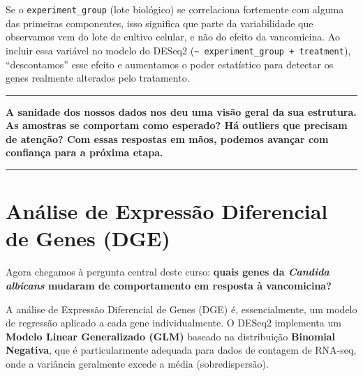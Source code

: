 \documentclass[
  letterpaper,
  DIV=11,
  numbers=noendperiod]{scrreprt}
\begin{document}
\begin{tcolorbox}[enhanced jigsaw, arc=.35mm, colframe=quarto-callout-important-color-frame, breakable, bottomrule=.15mm, colback=white, left=2mm, titlerule=0mm, opacityback=0, title=\textcolor{quarto-callout-important-color}{\faExclamation}\hspace{0.5em}{Por que incluir covariáveis?}, leftrule=.75mm, colbacktitle=quarto-callout-important-color!10!white, bottomtitle=1mm, toprule=.15mm, toptitle=1mm, rightrule=.15mm, opacitybacktitle=0.6, coltitle=black]

Se o \texttt{experiment\_group} (lote biológico) se correlaciona
fortemente com alguma das primeiras componentes, isso significa que
parte da variabilidade que observamos vem do lote de cultivo celular, e
não do efeito da vancomicina. Ao incluir essa variável no modelo do
DESeq2 (\texttt{\textasciitilde{}\ experiment\_group\ +\ treatment}),
``descontamos'' esse efeito e aumentamos o poder estatístico para
detectar os genes realmente alterados pelo tratamento.

\end{tcolorbox}

\begin{center}\rule{0.5\linewidth}{0.5pt}\end{center}

\textbf{A sanidade dos nossos dados nos deu uma visão geral da sua
estrutura. As amostras se comportam como esperado? Há outliers que
precisam de atenção? Com essas respostas em mãos, podemos avançar com
confiança para a próxima etapa.}

\begin{center}\rule{0.5\linewidth}{0.5pt}\end{center}

\section{Análise de Expressão Diferencial de Genes
(DGE)}\label{anuxe1lise-de-expressuxe3o-diferencial-de-genes-dge}

Agora chegamos à pergunta central deste curso: \textbf{quais genes da
\emph{Candida albicans} mudaram de comportamento em resposta à
vancomicina?}

A análise de Expressão Diferencial de Genes (DGE) é, essencialmente, um
modelo de regressão aplicado a cada gene individualmente. O DESeq2
implementa um \textbf{Modelo Linear Generalizado (GLM)} baseado na
distribuição \textbf{Binomial Negativa}, que é particularmente adequada
para dados de contagem de RNA-seq, onde a variância geralmente excede a
média (sobredispersão).
\end{document}

